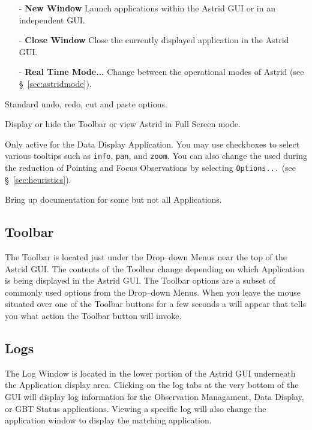 \begin{description}[leftmargin=*]
\item[File]
\begin{itemize}[itemsep=0pt,leftmargin=*]
\item[-] {\bf New Window} Launch applications within the \gls{Astrid} \gls{GUI} or in an
independent \gls{GUI}.
\item[-] {\bf Close Window} Close the currently displayed application in the \gls{Astrid}
\gls{GUI}.
\item[-] {\bf Real Time Mode...} Change between the operational modes of \gls{Astrid} (see
\S~\ref{sec:astridmode}).
\end{itemize}

\item[Edit] Standard  undo, redo, cut and paste options.

\item[View] Display or hide the Toolbar or view \gls{Astrid} in Full Screen mode.

\item[Tools] Only active for the Data Display Application.  You may use checkboxes to
select various tooltips such as {\tt info}, {\tt pan}, and {\tt zoom}.  You can also
change the  used during the reduction of Pointing and Focus
Observations by selecting {\tt Options...} (see \S~\ref{sec:heuristics}).

\item[Help] Bring up documentation for some but not all Applications.

\end{description}


\subsection{Toolbar}

The Toolbar is located just under the Drop--down Menus near the top of the
\gls{Astrid} \gls{GUI}.  The contents of the Toolbar change depending on which
Application is being displayed in the \gls{Astrid} \gls{GUI}.  The Toolbar options
are a subset of commonly used options from the Drop--down Menus.  When you leave
the mouse situated over one of the Toolbar buttons for a few seconds a 
will appear that tells you what action the Toolbar button will invoke.

\subsection{Logs}
The Log Window is located in the lower portion of the \gls{Astrid} \gls{GUI}
underneath the Application display area.  Clicking on the log tabs at the very bottom
of the \gls{GUI} will display log information for the Observation Managament, Data Display,
or GBT Status applications.  Viewing a specific log will also change the application
window to display the matching application.

